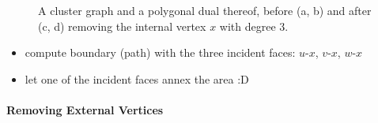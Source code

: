 \begin{figure}[H]
	\centering
	\quad
	\qquad
	\quad
	\caption{A cluster graph and a polygonal dual thereof, before (a, b) and after (c, d) removing the internal vertex $x$ with degree 3.}
	\label{fig:remove-vertex-example-internal}
\end{figure}

\begin{itemize}
	\item compute boundary (path) with the three incident faces: $u$-$x$, $v$-$x$, $w$-$x$
	\item let one of the incident faces annex the area :D
\end{itemize}

\lipsum



\paragraph{Removing External Vertices}

